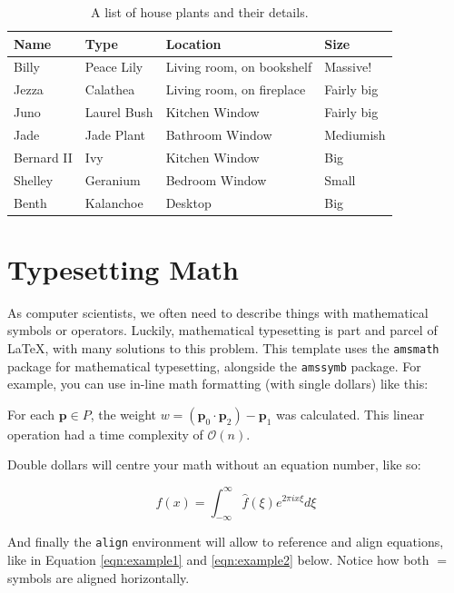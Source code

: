 \begin{table}[htb]
\centering
\caption{A list of house plants and their details.}
\begin{tabular}{l|l|l|l}
\textbf{Name} & \textbf{Type} & \textbf{Location}         & \textbf{Size} \\
\hline\hline
Billy         & Peace Lily    & Living room, on bookshelf & Massive!      \\
Jezza         & Calathea      & Living room, on fireplace & Fairly big    \\
Juno          & Laurel Bush   & Kitchen Window            & Fairly big    \\
Jade          & Jade Plant    & Bathroom Window           & Mediumish     \\
Bernard II    & Ivy           & Kitchen Window            & Big           \\
Shelley       & Geranium      & Bedroom Window            & Small        \\
Benth         & Kalanchoe     & Desktop                   & Big
\end{tabular}
\label{tbl:example-table}
\end{table}

\section{Typesetting Math}
As computer scientists, we often need to describe things with mathematical symbols or operators. Luckily, mathematical typesetting is part and parcel of \LaTeX, with many solutions to this problem. This template uses the \texttt{amsmath} package for mathematical typesetting, alongside the \texttt{amssymb} package. For example, you can use in-line math formatting (with single dollars) like this:

\begin{framed}
For each $\mathbf{p} \in P$, the weight $w = \left( \mathbf{p}_0 \cdot \mathbf{p}_2 \right) - \mathbf{p}_1$ was calculated. This linear operation had a time complexity of $\mathcal{O}(n)$.
\end{framed}

Double dollars will centre your math without an equation number, like so:

\begin{framed}
$$ f(x) = \int_{-\infty}^{\infty}{\hat{f}(\xi)e^{2\pi i x \xi}d\xi} $$
\end{framed}

And finally the \texttt{align} environment will allow to reference and align equations, like in Equation \ref{eqn:example1} and \ref{eqn:example2} below. Notice how both $=$ symbols are aligned horizontally.

